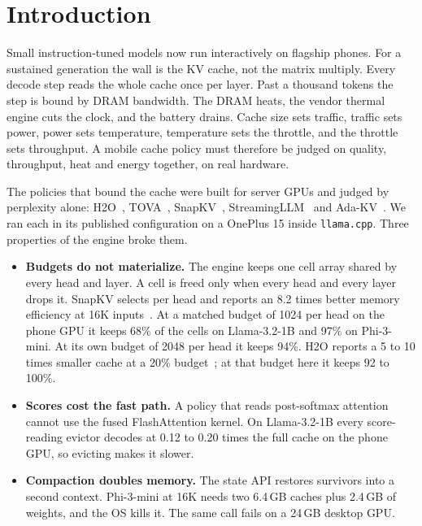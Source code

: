 \documentclass[sigconf, anonymous=false, screen=true]{acmart}
\begin{document}
\section{Introduction}
\label{sec:intro}

Small instruction-tuned models now run interactively on flagship phones. For a sustained generation the wall is the KV cache, not the matrix multiply. Every decode step reads the whole cache once per layer. Past a thousand tokens the step is bound by DRAM bandwidth. The DRAM heats, the vendor thermal engine cuts the clock, and the battery drains. Cache size sets traffic, traffic sets power, power sets temperature, temperature sets the throttle, and the throttle sets throughput. A mobile cache policy must therefore be judged on quality, throughput, heat and energy together, on real hardware.

The policies that bound the cache were built for server GPUs and judged by perplexity alone: H2O~\cite{zhang2023h2o}, TOVA~\cite{oren2024tova}, SnapKV~\cite{li2024snapkv}, StreamingLLM~\cite{xiao2024streamingllm} and Ada-KV~\cite{feng2025adakv}. We ran each in its published configuration on a OnePlus 15 inside \texttt{llama.cpp}. Three properties of the engine broke them.

\begin{itemize}[leftmargin=*, itemsep=1pt]
\item \textbf{Budgets do not materialize.} The engine keeps one cell array shared by every head and layer. A cell is freed only when every head and every layer drops it. SnapKV selects per head and reports an 8.2 times better memory efficiency at 16K inputs~\cite{li2024snapkv}. At a matched budget of 1024 per head on the phone GPU it keeps 68\% of the cells on Llama-3.2-1B and 97\% on Phi-3-mini. At its own budget of 2048 per head it keeps 94\%. H2O reports a 5 to 10 times smaller cache at a 20\% budget~\cite{zhang2023h2o}; at that budget here it keeps 92 to 100\%.
\item \textbf{Scores cost the fast path.} A policy that reads post-softmax attention cannot use the fused FlashAttention kernel. On Llama-3.2-1B every score-reading evictor decodes at 0.12 to 0.20 times the full cache on the phone GPU, so evicting makes it slower.
\item \textbf{Compaction doubles memory.} The state API restores survivors into a second context. Phi-3-mini at 16K needs two 6.4\,GB caches plus 2.4\,GB of weights, and the OS kills it. The same call fails on a 24\,GB desktop GPU.
\end{itemize}
\end{document}
